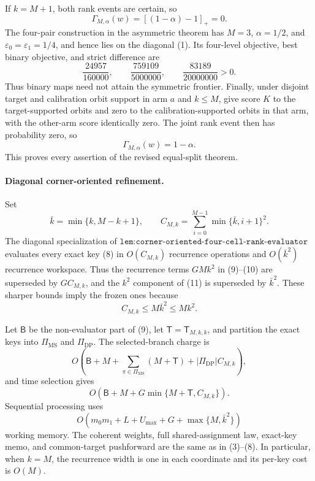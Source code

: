 If \(k=M+1\), both rank events are certain, so
\[
\Gamma_{M,\alpha}(w)=[(1-\alpha)-1]_+=0. \tag{12}
\]
The four-pair construction in the asymmetric theorem has \(M=3\), \(\alpha=1/2\), and \(\varepsilon_0=\varepsilon_1=1/4\), and hence lies on the diagonal (1). Its four-level objective, best binary objective, and strict difference are
\[
\frac{24957}{160000},\qquad \frac{759109}{5000000},\qquad \frac{83189}{20000000}>0. \tag{13}
\]
Thus binary maps need not attain the symmetric frontier. Finally, under disjoint target and calibration orbit support in arm \(a\) and \(k\le M\), give score \(K\) to the target-supported orbits and zero to the calibration-supported orbits in that arm, with the other-arm score identically zero. The joint rank event then has probability zero, so
\[
\Gamma_{M,\alpha}(w)=1-\alpha. \tag{14}
\]
This proves every assertion of the revised equal-split theorem.
\paragraph{Diagonal corner-oriented refinement.}
Set
\[
\bar k=\min\{k,M-k+1\},\qquad
C_{M,k}=\sum_{i=0}^{M-1}\min\{\bar k,i+1\}^2. \tag{15}
\]
The diagonal specialization of \(\texttt{lem:corner-oriented-four-cell-rank-evaluator}\) evaluates every exact key (8) in \(O(C_{M,k})\) recurrence operations and \(O(\bar k^2)\) recurrence workspace. Thus the recurrence terms \(GMk^2\) in (9)--(10) are superseded by \(GC_{M,k}\), and the \(k^2\) component of (11) is superseded by \(\bar k^2\). These sharper bounds imply the frozen ones because
\[
C_{M,k}\le M\bar k^2\le Mk^2. \tag{16}
\]

Let \(\mathsf B\) be the non-evaluator part of (9), let
\(\mathsf T=\mathsf T_{M,k,k}\), and partition the exact keys into
\(\Pi_{\mathrm{MS}}\) and \(\Pi_{\mathrm{DP}}\). The selected-branch charge is
\[
O\!\left(
\mathsf B+M+
\sum_{\pi\in\Pi_{\mathrm{MS}}}(M+\mathsf T)
+|\Pi_{\mathrm{DP}}|C_{M,k}
\right), \tag{17}
\]
and time selection gives
\[
O\!\left(
\mathsf B+M+
G\min\{M+\mathsf T,C_{M,k}\}
\right). \tag{18}
\]
Sequential processing uses
\[
O\!\left(
m_0m_1+L+U_{\max}+G+
\max\{M,\bar k^2\}
\right) \tag{19}
\]
working memory. The coherent weights, full shared-assignment law, exact-key memo, and common-target pushforward are the same as in (3)--(8). In particular, when \(k=M\), the recurrence width is one in each coordinate and its per-key cost is \(O(M)\).
